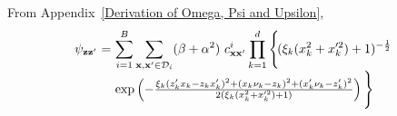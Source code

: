 \documentclass[conference]{IEEEtran}
\begin{document}
	From Appendix~\ref{Derivation of Omega, Psi and Upsilon},
	\begin{equation*}
		\hspace{-1.7mm}
		\begin{array}{rcl}
			\psi_{\mathbf{z}\mathbf{z}^\prime}&\hspace{-2.4mm}=&\hspace{-2.4mm}
				\displaystyle\sum_{i=1}^{B}\sum_{\mathbf{x},\mathbf{x}'\in\mathcal{D}_i}(\beta+\alpha^2)\ c^{i}_{\mathbf{x}\mathbf{x}'}\prod_{k=1}^{d}\Bigg\{\hspace{-0.5mm}(\xi_k(x_{k}^2+x_{k}^{\prime2})+1)^{-\frac{1}{2}}\\
			&&\hspace{-2.4mm}\exp\left(-\frac{\xi_k(z'_{k}x_{k}-z_{k}x'_{k})^2+(x_{k}\nu_k-z_{k})^2+(x'_{k}\nu_k-z'_{k})^2}{2(\xi_k(x_{k}^2+x_{k}^{\prime 2})+1)}\right)\Bigg\}
		\end{array}
	\end{equation*}
\end{document}
